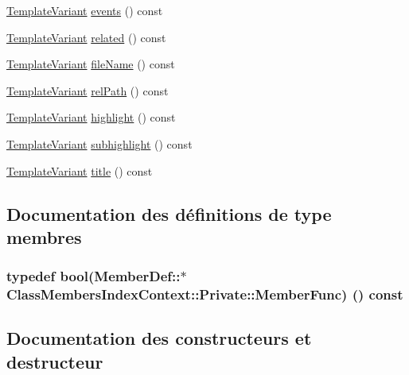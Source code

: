 \begin{DoxyCompactItemize}
\hyperlink{class_template_variant}{Template\+Variant} \hyperlink{class_class_members_index_context_1_1_private_a124eac685b841a9f7d5ff144d9811a87}{events} () const 
\item 
\hyperlink{class_template_variant}{Template\+Variant} \hyperlink{class_class_members_index_context_1_1_private_ade5edbce2e9ae4438bf54e27af752562}{related} () const 
\item 
\hyperlink{class_template_variant}{Template\+Variant} \hyperlink{class_class_members_index_context_1_1_private_a2ff1974875e7cdd2864c897d4ac1a5e6}{file\+Name} () const 
\item 
\hyperlink{class_template_variant}{Template\+Variant} \hyperlink{class_class_members_index_context_1_1_private_afb66a047ce435736ef1debb0ddef83fa}{rel\+Path} () const 
\item 
\hyperlink{class_template_variant}{Template\+Variant} \hyperlink{class_class_members_index_context_1_1_private_a2446850596ea4423c42d18227e4d0d56}{highlight} () const 
\item 
\hyperlink{class_template_variant}{Template\+Variant} \hyperlink{class_class_members_index_context_1_1_private_ae0d2a5ba4311c5eac6466ea16808128f}{subhighlight} () const 
\item 
\hyperlink{class_template_variant}{Template\+Variant} \hyperlink{class_class_members_index_context_1_1_private_af6d31339230b9de75c879c3c14130a72}{title} () const 
\end{DoxyCompactItemize}


\subsection{Documentation des définitions de type membres}
\hypertarget{class_class_members_index_context_1_1_private_a8732304406adf01d0845051997d13762}{}
\subsubsection[{Member\+Func}]{\setlength{\rightskip}{0pt plus 5cm}typedef {\bf bool}(Member\+Def\+::$\ast$ Class\+Members\+Index\+Context\+::\+Private\+::\+Member\+Func) () const }\label{class_class_members_index_context_1_1_private_a8732304406adf01d0845051997d13762}


\subsection{Documentation des constructeurs et destructeur}
\hypertarget{class_class_members_index_context_1_1_private_a11a6c50f3afb0aab78db67e9447871dd}{}
